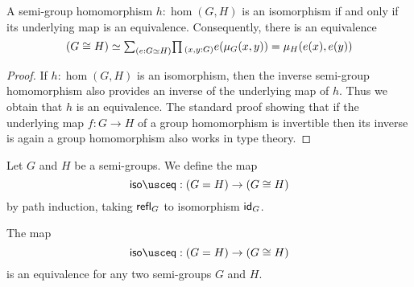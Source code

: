 \begin{lem}\label{lem:grp_iso}
  A semi-group homomorphism $h:\hom(G,H)$ is an isomorphism if and only if its underlying map is an equivalence. Consequently, there is an equivalence
  \begin{equation*}
    (G\cong H)\simeq \sm{e:G\simeq H}\prd{x,y:G}e(\mu_G(x,y))=\mu_H(e(x),e(y))
  \end{equation*}
\end{lem}

\begin{proof}
  If $h:\hom(G,H)$ is an isomorphism, then the inverse semi-group homomorphism also provides an inverse of the underlying map of $h$. Thus we obtain that $h$ is an equivalence. The standard proof showing that if the underlying map $f:G\to H$ of a group homomorphism is invertible then its inverse is again a group homomorphism also works in type theory.
\end{proof}

\begin{defn}
Let $G$ and $H$ be a semi-groups. We define the map
\begin{equation*}
\isoeq : (G=H)\to (G\cong H)
\end{equation*}
by path induction, taking $\refl{G}$ to isomorphism $\idfunc[G]$.
\end{defn}

\begin{thm}\label{thm:iso-eq-semi-group}
The map
\begin{equation*}
\isoeq : (G=H)\to (G\cong H)
\end{equation*}
is an equivalence for any two semi-groups $G$ and $H$.
\end{thm}


